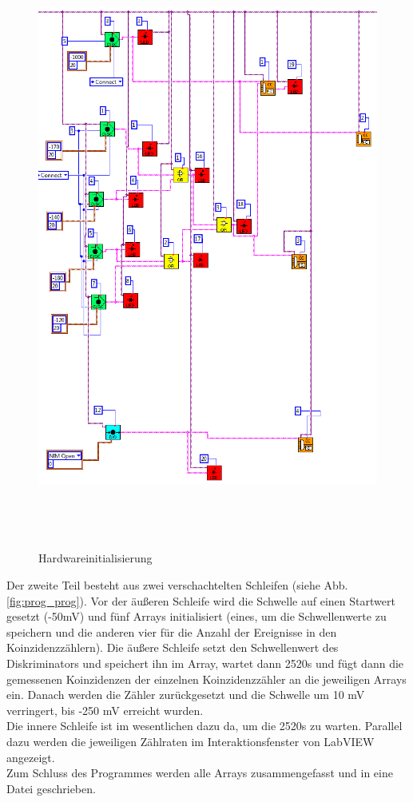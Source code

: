 \begin{figure}
\centering
\includegraphics[height=20cm]{data/friedrich/prog_init.png}
\caption{Hardwareinitialisierung}
\label{fig:prog_init}
\end{figure}

Der zweite Teil besteht aus zwei verschachtelten Schleifen (siehe Abb. \ref{fig:prog_prog}). Vor der äußeren Schleife wird die Schwelle auf einen Startwert gesetzt (-50\si{\milli\volt}) und fünf Arrays initialisiert (eines, um die Schwellenwerte zu speichern und die anderen vier für die Anzahl der Ereignisse in den Koinzidenzzählern). Die äußere Schleife setzt den Schwellenwert des Diskriminators und speichert ihn im Array, wartet dann 2520\si{\second} und fügt dann die gemessenen Koinzidenzen der einzelnen Koinzidenzzähler an die jeweiligen Arrays ein. Danach werden die Zähler zurückgesetzt und die Schwelle um 10 \si{\milli\volt} verringert, bis -250 \si{\milli\volt} erreicht wurden.\\
Die innere Schleife ist im wesentlichen dazu da, um die 2520\si{\second} zu warten. Parallel dazu werden die jeweiligen Zählraten im Interaktionsfenster von LabVIEW angezeigt.\\
Zum Schluss des Programmes werden alle Arrays zusammengefasst und in eine Datei geschrieben.

